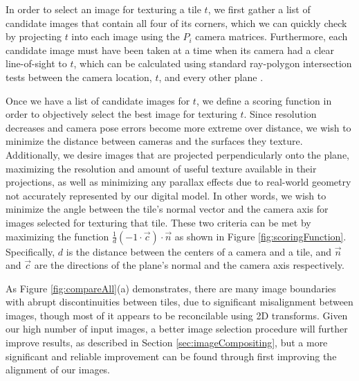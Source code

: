 \documentclass[]{spie}  %
\begin{document}
In order to select an image for texturing a tile $t$, we first gather
a list of candidate images that contain all four of its corners, which
we can quickly check by projecting $t$ into each image using the $P_i$
camera matrices. Furthermore, each candidate image must have been
taken at a time when its camera had a clear line-of-sight to $t$,
which can be calculated using standard ray-polygon intersection tests
between the camera location, $t$, and every other plane
\cite{rayintersection}.

Once we have a list of candidate images for $t$, we define a scoring
function in order to objectively select the best image for texturing
$t$. Since resolution decreases and camera pose errors become more
extreme over distance, we wish to minimize the distance between
cameras and the surfaces they texture. Additionally, we desire images
that are projected perpendicularly onto the plane, maximizing the
resolution and amount of useful texture available in their
projections, as well as minimizing any parallax effects due to
real-world geometry not accurately represented by our digital
model. In other words, we wish to minimize the angle between the
tile's normal vector and the camera axis for images selected for
texturing that tile. These two criteria can be met by maximizing the
function $\frac{1}{d} (-1 \cdot \vec{c}) \cdot \vec{n}$ as shown in
Figure \ref{fig:scoringFunction}. Specifically, $d$ is the distance
between the centers of a camera and a tile, and $\vec{n}$ and
$\vec{c}$ are the directions of the plane's normal and the camera axis
respectively.


As Figure \ref{fig:compareAll}(a) demonstrates, there are many image
boundaries with abrupt discontinuities between tiles, due to
significant misalignment between images, though most of it appears to
be reconcilable using 2D transforms. Given our high number of input
images, a better image selection procedure will further improve
results, as described in Section \ref{sec:imageCompositing}, but a
more significant and reliable improvement can be found through first
improving the alignment of our images.
\end{document}
